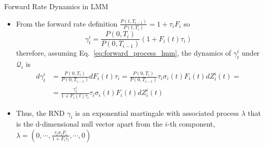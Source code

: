 \documentclass{beamer}
\begin{document}
\begin{frame}{Forward Rate Dynamics in LMM}
  \begin{itemize}
  \item From the forward rate definition $\frac{P(t,T_{i-1})}{P(t,T_i)} = 1 + \tau_i F_i$ so
    \begin{equation*}
      \gamma^i_t = \frac{P(0, T_i)}{P(0, T_{i-1})}(1+F_i(t)\tau_i)
    \end{equation*}
    therefore, assuming Eq.~\ref{eq:forward_process_lmm}, the dynamics of $\gamma^i_t$ under $\mathcal{Q}_i$ is
    \begin{equation*}
      \begin{aligned}
	d\gamma^i_t &= \frac{P(0, T_i)}{P(0, T_{i-1})}dF_i(t)\tau_i = \frac{P(0, T_i)}{P(0, T_{i-1})}\tau_i\sigma_i(t)F_i(t)dZ^i_i(t) = \\ &= \frac{\gamma_t^i}{1+F_i(t)\tau_i}\tau_i\sigma_i(t)F_i(t)dZ^i_i(t)
      \end{aligned}
    \end{equation*}
  \item Thus, the RND $\gamma_i$ is an exponential martingale with associated process $\lambda$ that is the d-dimensional null vector apart from the $i$-th component, $\lambda = \left(0,\cdots,\frac{\tau_i\sigma_iF_i}{1+F_i\tau_i},\cdots, 0\right)$
  \end{itemize}
\end{frame}
\end{document}
